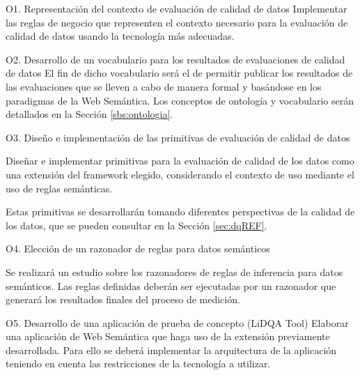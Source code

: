 \begin{definitionlist}
\item[O1. Representación del contexto de evaluación de calidad de datos]
Implementar  las  reglas  de  negocio  que representen el contexto necesario
para la evaluación de
calidad  de datos usando la tecnología más adecuadas.
\label{sec:reglas}

\item[O2. Desarrollo de un vocabulario para los resultados
  de evaluaciones de calidad de datos]
El fin de dicho vocabulario será el de permitir publicar los
resultados de las evaluaciones que se lleven a cabo de manera formal y basándose
en los paradigmas de la Web Semántica. Los conceptos de ontología y vocabulario
serán detallados en la Sección \ref{sbs:ontologia}. 


\item[O3. Diseño e implementación de las primitivas de evaluación de calidad de datos]

Diseñar e implementar primitivas para la evaluación de calidad de los datos como una
extensión del framework elegido, considerando el contexto de uso mediante el uso
de reglas semánticas.

Estas primitivas se desarrollarán tomando diferentes perspectivas de la calidad
de los datos, que se pueden consultar en la Sección \ref{sec:dqREF}. 


\item[O4. Elección de un razonador de reglas para datos semánticos]

Se realizará un estudio sobre los razonadores de reglas de inferencia para
datos semánticos. Las reglas definidas deberán ser
ejecutadas por un razonador que generará los resultados finales del proceso de
medición. 


\item[O5. Desarrollo de una aplicación de prueba de concepto (LiDQA Tool)]
Elaborar una aplicación de Web Semántica que haga uso de la extensión
previamente desarrollada. Para ello se deberá implementar la arquitectura de
la aplicación teniendo en cuenta las restricciones de la tecnología a utilizar.

\end{definitionlist}
